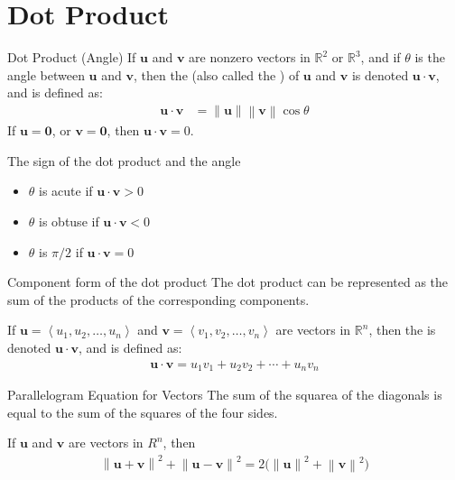 \documentclass[\main/notes.tex]{subfiles}
\begin{document}
		\section{Dot Product}
			\begin{definition}{Dot Product (Angle)}
				If $\mathbf{u}$ and $\mathbf{v}$ are nonzero vectors in $\mathbb{R}^{2}$ or $\mathbb{R}^{3}$, and if $\theta$ is the angle between $\mathbf{u}$ and $\mathbf{v}$, then the  (also called the ) of $\mathbf{u}$ and $\mathbf{v}$ is denoted $\mathbf{u} \cdot \mathbf{v}$, and is defined as:
				\begin{align*}
					\mathbf{u} \cdot \mathbf{v} &= \left\lVert \mathbf{u}\right\rVert \left\lVert \mathbf{v}\right\rVert \cos \theta
				\end{align*}
				If $\mathbf{u} = \mathbf{0}$, or $\mathbf{v} = \mathbf{0}$, then $\mathbf{u} \cdot \mathbf{v} = 0$.
			\end{definition}
			\begin{sidenote}{The sign of the dot product and the angle}
				\begin{itemize}
					\item $\theta$ is acute if $\mathbf{u} \cdot \mathbf{v} > 0$
					\item $\theta$ is obtuse if $\mathbf{u} \cdot \mathbf{v} < 0$
					\item $\theta$ is $\pi/2$ if $\mathbf{u} \cdot \mathbf{v} = 0$
				\end{itemize}
			\end{sidenote}
			\begin{definition}{Component form of the dot product}
				The dot product can be represented as the sum of the products of the corresponding components.

				If $\mathbf{u} = \left\langle u_{1}, u_{2}, \ldots, u_{n}\right\rangle$ and $\mathbf{v} = \left\langle v_{1}, v_{2}, \ldots, v_{n}\right\rangle$ are vectors in $\mathbb{R}^{n}$, then the  is denoted $\mathbf{u} \cdot \mathbf{v}$, and is defined as:
				\begin{align*}
					\mathbf{u} \cdot \mathbf{v} = u_{1}v_{1} + u_{2}v_{2} + \cdots + u_{n}v_{n}
				\end{align*}
			\end{definition}
			\begin{theorem}{Parallelogram Equation for Vectors}
				The sum of the squarea of the diagonals is equal to the sum of the squares of the four sides.

				If $\mathbf{u}$ and $\mathbf{v}$ are vectors in $R^{n}$, then
				\begin{align*}
					\left\lVert \mathbf{u} + \mathbf{v}\right\rVert^{2} + \left\lVert \mathbf{u} - \mathbf{v}\right\rVert^{2} = 2 \biggl(\left\lVert \mathbf{u} \right\rVert^{2} + \left\lVert\mathbf{v}\right\rVert^{2}\biggr)
				\end{align*}
			\end{theorem}
\end{document}
